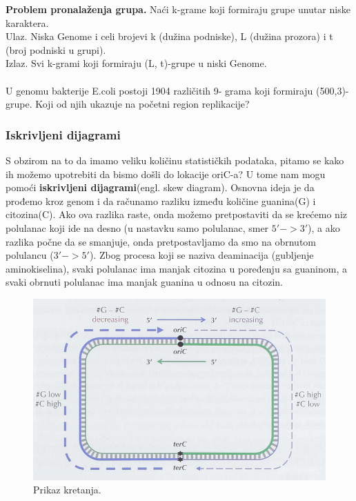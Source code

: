 \textbf{Problem pronalaženja grupa.} Naći k-grame koji
formiraju grupe unutar niske karaktera.\\
Ulaz. Niska Genome i celi brojevi k (dužina
podniske), L (dužina prozora) i t (broj podniski u
grupi).\\
Izlaz. Svi k-grami koji formiraju (L, t)-grupe u
niski Genome.\\\\
U genomu bakterije E.coli postoji 1904 različitih 9-
grama koji formiraju (500,3)-grupe. Koji od njih
ukazuje na početni region replikacije?

\subsubsection{Iskrivljeni dijagrami}

S obzirom na to da imamo veliku količinu statističkih podataka, pitamo se kako ih možemo upotrebiti da bismo došli do lokacije oriC-a? U tome nam mogu pomoći \textbf{iskrivljeni dijagrami}(engl. skew diagram). Osnovna ideja je da prođemo kroz genom i da računamo razliku između količine guanina(G) i citozina(C). Ako ova razlika raste, onda možemo pretpostaviti da se krećemo niz polulanac koji ide na desno (u nastavku samo polulanac, smer $5'-> 3'$), a ako razlika počne da se smanjuje, onda pretpostavljamo da smo na obrnutom polulancu ($3' -> 5'$). Zbog procesa koji se naziva deaminacija (gubljenje aminokiselina), svaki polulanac ima manjak citozina u poređenju sa guaninom, a svaki obrnuti polulanac ima manjak guanina u odnosu na citozin. 

\begin{figure}[h]
\caption{Prikaz kretanja.}
\centering
\includegraphics[width=1\textwidth]{poglavlja/1/slike/Polulanci_CG.png}
\end{figure} 

